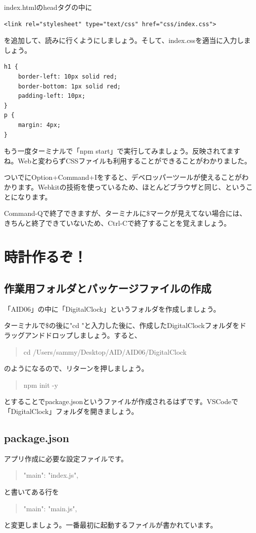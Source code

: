 \documentclass[mingoth,11pt,a4j,uplatex]{jsarticle}
\begin{document}
index.htmlのheadタグの中に
\begin{lstlisting}[caption=Hello World：index.html headタグ内]
    <link rel="stylesheet" type="text/css" href="css/index.css">
\end{lstlisting}
を追加して、読みに行くようにしましょう。そして、index.cssを適当に入力しましょう。
\begin{lstlisting}[caption=Hello World：css/index.css]
h1 {
    border-left: 10px solid red;
    border-bottom: 1px solid red;
    padding-left: 10px;
}
p {
    margin: 4px;
}
\end{lstlisting}
もう一度ターミナルで「npm start」で実行してみましょう。反映されてますね。Webと変わらずCSSファイルも利用することができることがわかりました。

ついでにOption+Command+Iをすると、デベロッパーツールが使えることがわかります。Webkitの技術を使っているため、ほとんどブラウザと同じ、ということになります。

Command-Qで終了できますが、ターミナルに\$マークが見えてない場合には、きちんと終了できていないため、Ctrl-Cで終了することを覚えましょう。

\section{時計作るぞ！}

\subsection{作業用フォルダとパッケージファイルの作成}
「AID06」の中に「DigitalClock」というフォルダを作成しましょう。

ターミナルで\$の後に"cd "と入力した後に、作成したDigitalClockフォルダをドラッグアンドドロップしましょう。すると、
\begin{quote}
cd /Users/sammy/Desktop/AID/AID06/DigitalClock 
\end{quote}
のようになるので、リターンを押しましょう。

\begin{quote}
npm init -y
\end{quote}
とすることでpackage.jsonというファイルが作成されるはずです。VSCodeで「DigitalClock」フォルダを開きましょう。

\subsection{package.json}
アプリ作成に必要な設定ファイルです。
\begin{quote}
  "main": "index.js",
\end{quote}
と書いてある行を
\begin{quote}
  "main": "main.js",
\end{quote}
と変更しましょう。一番最初に起動するファイルが書かれています。
\end{document}
